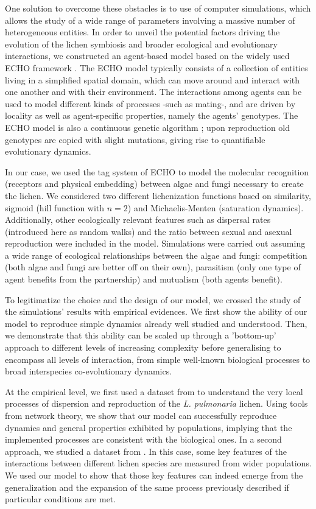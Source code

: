 \documentclass[fleqn,10pt]{wlscirep}
\begin{document}
One solution to overcome these obstacles is to use of computer simulations, which allows the study of a wide range of parameters involving a massive number of heterogeneous entities. 
In order to unveil the potential factors driving the evolution of the lichen symbiosis and broader ecological and evolutionary interactions, we constructed an agent-based model based on the widely used ECHO framework \cite{holland1999echoing,holland1995hidden}. The ECHO model typically consists of a collection of entities living in a simplified spatial domain, which can move around and interact with one another and with their environment. The interactions among agents can be used to model different kinds of processes -such as mating-, and are driven by locality as well as agent-specific properties, namely the agents' genotypes. The ECHO model is also a continuous genetic algorithm \cite{mitchell1998introduction}; upon reproduction old genotypes are copied with slight mutations, giving rise to quantifiable evolutionary dynamics.

In our case, we used the tag system of ECHO to model the molecular recognition (receptors and physical embedding) between algae and fungi necessary to create the lichen. We considered two different lichenization functions based on similarity, sigmoid (hill function with $n=2$) and Michaelis-Menten (saturation dynamics). Additionally, other ecologically relevant features such as dispersal rates (introduced here as random walks) and the ratio between sexual and asexual reproduction were included in the model. Simulations were carried out assuming a wide range of ecological relationships between the algae and fungi: competition (both algae and fungi are better off on their own), parasitism (only one type of agent benefits from the partnership) and mutualism (both agents benefit).

To legitimatize the choice and the design of our model, we crossed the study of the simulations' results with empirical evidences. We first show the ability of our model to reproduce simple dynamics already well studied and understood. Then, we demonstrate that this ability can be scaled up through a 'bottom-up' approach to different levels of increasing complexity before generalising to encompass all levels of interaction, from simple well-known biological processes to broad interspecies co-evolutionary dynamics.

At the empirical level, we first used a dataset from \cite{dal2012vertical} to understand the very local processes of dispersion and reproduction of the {\em L. pulmonaria} lichen.
Using tools from network theory, we show that our model can successfully reproduce dynamics and general properties exhibited by populations, implying that the implemented processes are consistent with the biological ones. In a second approach, we studied a dataset from \cite{dal2014molecular}. In this case, some key features of the interactions between different lichen species are measured from wider populations. We used our model to show that those key features can indeed emerge from the generalization and the expansion of the same process previously described if particular conditions are met. 
\end{document}
